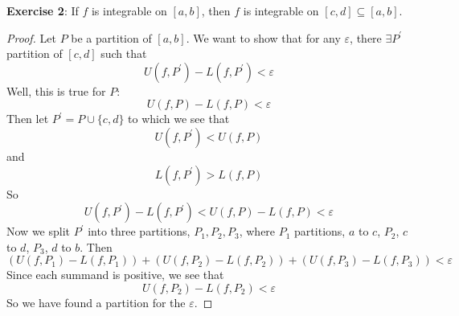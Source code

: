 \documentclass{article}
\begin{document}
\textbf{Exercise 2}: If $f$ is integrable on $[a, b]$, then $f$ is integrable on $[c, d] \subseteq [a, b]$.
    \begin{proof}
        Let $P$ be a partition of $[a, b]$. We want to show that for any $\varepsilon$, there $\exists P^{\prime}$ partition of $[c, d]$ such that 
            \begin{equation*}
                U(f, P^{\prime}) - L(f, P^{\prime}) < \varepsilon
            \end{equation*}
        Well, this is true for $P$:
            \begin{equation*}
                U(f, P) - L(f, P) < \varepsilon
            \end{equation*}
        Then let $P^{\prime} = P \cup \{c, d\}$ to which we see that 
            \begin{equation*}
                U(f, P^{\prime}) < U(f, P)
            \end{equation*}
        and 
            \begin{equation*}
                L(f, P^{\prime}) > L(f, P)
            \end{equation*}
        So 
            \begin{equation*}
                U(f, P^{\prime}) - L(f, P^{\prime}) < U(f, P) - L(f, P) < \varepsilon
            \end{equation*}
        Now we split $P^{\prime}$ into three partitions, $P_{1}, P_{2}, P_{3}$, where $P_1$ partitions, $a$ to $c$, $P_{2}$, $c$ to $d$, $P_{3}$, $d$ to $b$. Then
            \begin{equation*}
                (U(f, P_{1}) - L(f, P_{1})) + (U(f, P_{2}) - L(f, P_{2})) + (U(f, P_{3}) - L(f, P_{3})) < \varepsilon
            \end{equation*}
        Since each summand is positive, we see that 
            \begin{equation*}
                U(f, P_{2}) - L(f, P_{2}) < \varepsilon
            \end{equation*}
        So we have found a partition for the $\varepsilon$.
    \end{proof}
\end{document}
